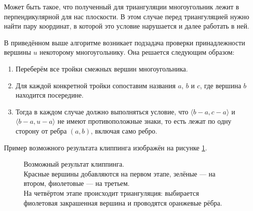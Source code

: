 \documentclass{article}
\begin{document}
Может быть такое, что полученный для триангуляции многоугольник лежит в перпендикулярной для нас плоскости.
В этом случае перед триангуляцией нужно найти пару координат, в которой это условие нарушается и далее работать в ней.

В приведённом выше алгоритме возникает подзадача проверки принадлежности вершины $u$ некоторому многоугольнику.
Она решается следующим образом:

\begin{enumerate}
	\item Переберём все тройки смежных вершин многоугольника.
	\item Для каждой конкретной тройки сопоставим названия $a$, $b$ и $c$, где вершина $b$ находится посередине.
	\item Тогда в каждом случае должно выполняться условие, что $\langle b - a, c - a \rangle$ и $\langle b - a, u - a \rangle$ не имеют противоположные знаки, то есть лежат по одну сторону от ребра $(a, b)$, включая само ребро.
\end{enumerate}

Пример возможного результата клиппинга изображён на рисунке \ref{clipping}.

\begin{figure}[ht]
    \caption{Возможный результат клиппинга. \\
    		 Красные вершины добавляются на первом этапе, зелёные --- на втором, фиолетовые --- на третьем. \\
    		 На четвёртом этапе происходит триангуляция: выбирается фиолетовая закрашенная вершина и проводятся оранжевые рёбра.}
    \label{clipping}
\end{figure}
\end{document}
